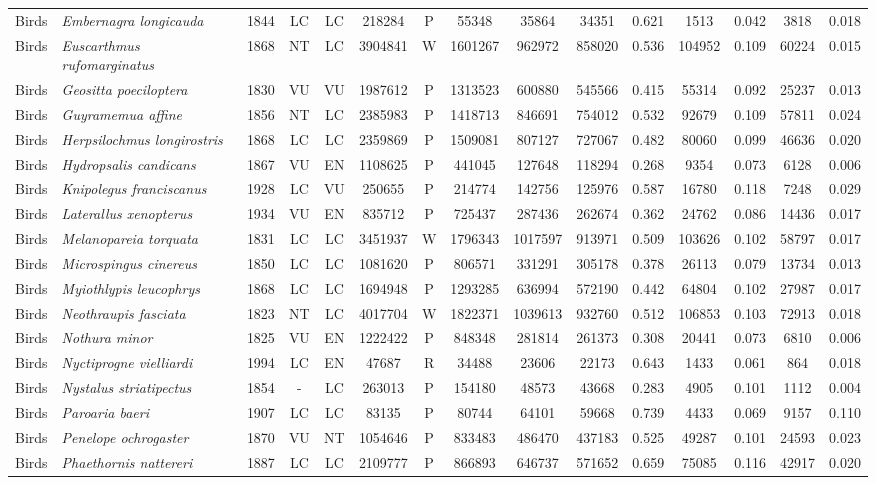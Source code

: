 \documentclass[12pt,openright,oneside,a4paper,english]{abntex2}
\begin{document}
\begin{landscape}
\begin{longtable}{llccccccccccccc}
		Birds&\textit{Embernagra longicauda}&1844&LC&LC&218284&P&55348&35864&34351&0.621&1513&0.042&3818&0.018\\
		Birds&\textit{Euscarthmus rufomarginatus}&1868&NT&LC&3904841&W&1601267&962972&858020&0.536&104952&0.109&60224&0.015\\
		Birds&\textit{Geositta poeciloptera}&1830&VU&VU&1987612&P&1313523&600880&545566&0.415&55314&0.092&25237&0.013\\
		Birds&\textit{Guyramemua affine}&1856&NT&LC&2385983&P&1418713&846691&754012&0.532&92679&0.109&57811&0.024\\
		Birds&\textit{Herpsilochmus longirostris}&1868&LC&LC&2359869&P&1509081&807127&727067&0.482&80060&0.099&46636&0.020\\
		Birds&\textit{Hydropsalis candicans}&1867&VU&EN&1108625&P&441045&127648&118294&0.268&9354&0.073&6128&0.006\\
		Birds&\textit{Knipolegus franciscanus}&1928&LC&VU&250655&P&214774&142756&125976&0.587&16780&0.118&7248&0.029\\
		Birds&\textit{Laterallus xenopterus}&1934&VU&EN&835712&P&725437&287436&262674&0.362&24762&0.086&14436&0.017\\
		Birds&\textit{Melanopareia torquata}&1831&LC&LC&3451937&W&1796343&1017597&913971&0.509&103626&0.102&58797&0.017\\
		Birds&\textit{Microspingus cinereus}&1850&LC&LC&1081620&P&806571&331291&305178&0.378&26113&0.079&13734&0.013\\
		Birds&\textit{Myiothlypis leucophrys}&1868&LC&LC&1694948&P&1293285&636994&572190&0.442&64804&0.102&27987&0.017\\
		Birds&\textit{Neothraupis fasciata}&1823&NT&LC&4017704&W&1822371&1039613&932760&0.512&106853&0.103&72913&0.018\\
		Birds&\textit{Nothura minor}&1825&VU&EN&1222422&P&848348&281814&261373&0.308&20441&0.073&6810&0.006\\
		Birds&\textit{Nyctiprogne vielliardi}&1994&LC&EN&47687&R&34488&23606&22173&0.643&1433&0.061&864&0.018\\
		Birds&\textit{Nystalus striatipectus}&1854&-&LC&263013&P&154180&48573&43668&0.283&4905&0.101&1112&0.004\\
		Birds&\textit{Paroaria baeri}&1907&LC&LC&83135&P&80744&64101&59668&0.739&4433&0.069&9157&0.110\\
		Birds&\textit{Penelope ochrogaster}&1870&VU&NT&1054646&P&833483&486470&437183&0.525&49287&0.101&24593&0.023\\
		Birds&\textit{Phaethornis nattereri}&1887&LC&LC&2109777&P&866893&646737&571652&0.659&75085&0.116&42917&0.020\\

\end{longtable}
\end{landscape}
\end{document}
